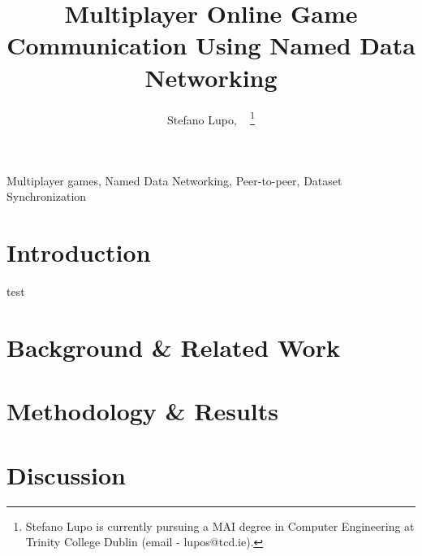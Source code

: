 \documentclass[journal]{IEEEtran}
\author{Stefano Lupo, ~\IEEEmembership{MAI, Trinity College Dublin}%
\thanks{Stefano Lupo is currently pursuing a MAI degree in Computer Engineering at Trinity College Dublin (email - lupos@tcd.ie). }%
}
\title{Multiplayer Online Game Communication Using Named Data Networking}
\begin{document}
\maketitle

\begin{abstract}
\end{abstract}

\begin{IEEEkeywords}
    Multiplayer games, Named Data Networking, Peer-to-peer, Dataset Synchronization
\end{IEEEkeywords}

\section{Introduction}
test\cite{ndn}

\section{Background \& Related Work}

\section{Methodology \& Results}

\section{Discussion}
\end{document}

